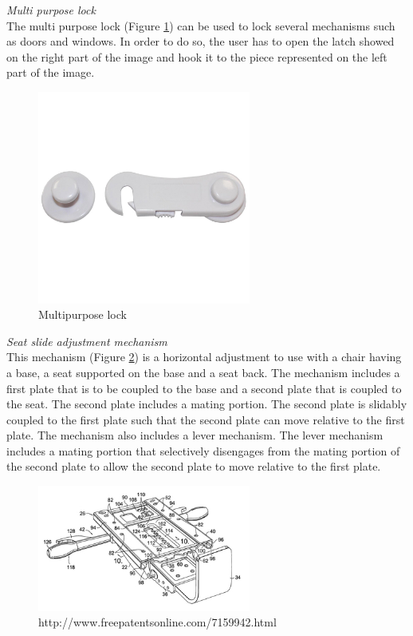 \noindent\emph{Multi purpose lock}\\
The multi purpose lock (Figure \ref{fig:lock}) can be used to lock several mechanisms such as doors and windows. In order to do so, the user has to open the latch showed on the right part of the image and hook it to the piece represented on the left part of the image.\\

\begin{figure}[h]
\centering
\includegraphics[width=7cm]{brazil_images/image044.png}
\caption{Multipurpose lock}
\label{fig:lock}
\end{figure}


\noindent\emph{Seat slide adjustment mechanism}\\

This mechanism (Figure \ref{fig:patent}) is a horizontal adjustment to use with a chair having a base, a seat supported on the base and a seat back. The mechanism includes a first plate that is to be coupled to the base and a second plate that is coupled to the seat. The second plate includes a mating portion. The second plate is slidably coupled to the first plate such that the second plate can move relative to the first plate. The mechanism also includes a lever mechanism. The lever mechanism includes a mating portion that selectively disengages from the mating portion of the second plate to allow the second plate to move relative to the first plate.\\

\begin{figure}[h]
\centering
\includegraphics[width=7cm]{brazil_images/image045.png}
\caption{http://www.freepatentsonline.com/7159942.html}
\label{fig:patent}
\end{figure}

